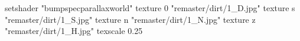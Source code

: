 setshader "bumpspecparallaxworld"
    texture 0 "remaster/dirt/1_D.jpg"
    texture s "remaster/dirt/1_S.jpg"
    texture n "remaster/dirt/1_N.jpg"
    texture z "remaster/dirt/1_H.jpg"
    texscale 0.25